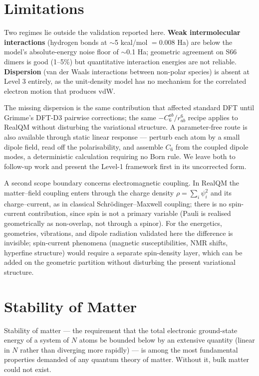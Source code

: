 \documentclass[11pt]{article}
\begin{document}
\section{Limitations}\label{sec:limitations}

Two regimes lie outside the validation reported here. \textbf{Weak intermolecular interactions} (hydrogen bonds at $\sim$5 kcal/mol $= 0.008$ Ha) are below the model's absolute-energy noise floor of $\sim$0.1 Ha; geometric agreement on S66 dimers is good (1--5\%) but quantitative interaction energies are not reliable. \textbf{Dispersion} (van der Waals interactions between non-polar species) is absent at Level 3 entirely, as the unit-density model has no mechanism for the correlated electron motion that produces vdW.

The missing dispersion is the same contribution that affected standard DFT until Grimme's DFT-D3 pairwise corrections; the same $-C_6^{ab}/r_{ab}^6$ recipe applies to RealQM without disturbing the variational structure. A parameter-free route is also available through static linear response --- perturb each atom by a small dipole field, read off the polarisability, and assemble $C_6$ from the coupled dipole modes, a deterministic calculation requiring no Born rule. We leave both to follow-up work and present the Level-1 framework first in its uncorrected form.

A second scope boundary concerns electromagnetic coupling. In RealQM the matter--field coupling enters through the charge density $\rho = \sum_i \psi_i^2$ and its charge--current, as in classical Schr\"odinger--Maxwell coupling; there is no spin-current contribution, since spin is not a primary variable (Pauli is realised geometrically as non-overlap, not through a spinor). For the energetics, geometries, vibrations, and dipole radiation validated here the difference is invisible; spin-current phenomena (magnetic susceptibilities, NMR shifts, hyperfine structure) would require a separate spin-density layer, which can be added on the geometric partition without disturbing the present variational structure.

\section{Stability of Matter}\label{sec:som}

Stability of matter --- the requirement that the total electronic ground-state energy of a system of $N$ atoms be bounded below by an extensive quantity (linear in $N$ rather than diverging more rapidly) --- is among the most fundamental properties demanded of any quantum theory of matter. Without it, bulk matter could not exist.
\end{document}
